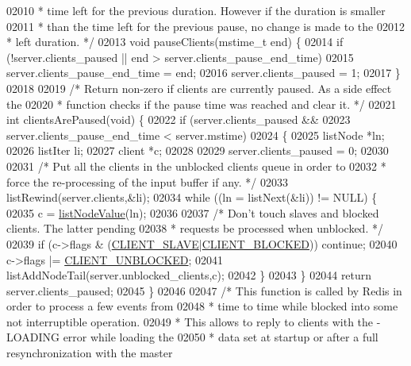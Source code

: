 \begin{DoxyCode}
{{{{{{{{{{{{{{{{{{{{02010 \textcolor{comment}{ * time left for the previous duration. However if the duration is smaller}
02011 \textcolor{comment}{ * than the time left for the previous pause, no change is made to the}
02012 \textcolor{comment}{ * left duration. */}
02013 \textcolor{keywordtype}{void} pauseClients(mstime\_t end) \{
02014     \textcolor{keywordflow}{if} (!server.clients\_paused || end > server.clients\_pause\_end\_time)
02015         server.clients\_pause\_end\_time = end;
02016     server.clients\_paused = 1;
02017 \}
02018 
02019 \textcolor{comment}{/* Return non-zero if clients are currently paused. As a side effect the}
02020 \textcolor{comment}{ * function checks if the pause time was reached and clear it. */}
02021 \textcolor{keywordtype}{int} clientsArePaused(\textcolor{keywordtype}{void}) \{
02022     \textcolor{keywordflow}{if} (server.clients\_paused &&
02023         server.clients\_pause\_end\_time < server.mstime)
02024     \{
02025         listNode *ln;
02026         listIter li;
02027         client *c;
02028 
02029         server.clients\_paused = 0;
02030 
02031         \textcolor{comment}{/* Put all the clients in the unblocked clients queue in order to}
02032 \textcolor{comment}{         * force the re-processing of the input buffer if any. */}
02033         listRewind(server.clients,&li);
02034         \textcolor{keywordflow}{while} ((ln = listNext(&li)) != NULL) \{
02035             c = \hyperlink{adlist_8h_af84cae230e7180ebcda1e2736fce9f65}{listNodeValue}(ln);
02036 
02037             \textcolor{comment}{/* Don't touch slaves and blocked clients. The latter pending}
02038 \textcolor{comment}{             * requests be processed when unblocked. */}
02039             \textcolor{keywordflow}{if} (c->flags & (\hyperlink{server_8h_ae9f6995948253652bc9454d79a72f4a7}{CLIENT\_SLAVE}|\hyperlink{server_8h_a503ad979164a52f0f5e2a63e4c7da3a0}{CLIENT\_BLOCKED})) \textcolor{keywordflow}{continue};
02040             c->flags |= \hyperlink{server_8h_a1252372d6834686c29e958d9d96367a8}{CLIENT\_UNBLOCKED};
02041             listAddNodeTail(server.unblocked\_clients,c);
02042         \}
02043     \}
02044     \textcolor{keywordflow}{return} server.clients\_paused;
02045 \}
02046 
02047 \textcolor{comment}{/* This function is called by Redis in order to process a few events from}
02048 \textcolor{comment}{ * time to time while blocked into some not interruptible operation.}
02049 \textcolor{comment}{ * This allows to reply to clients with the -LOADING error while loading the}
02050 \textcolor{comment}{ * data set at startup or after a full resynchronization with the master}
}}}}}}}}}}}}}}}}}}}}
\end{DoxyCode}
